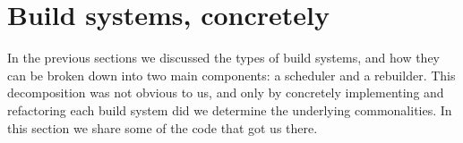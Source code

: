 \section{Build systems, concretely}\label{sec-implementations}

In the previous sections we discussed the types of build systems, and how they
can be broken down into two main components: a scheduler and a rebuilder. This
decomposition was not obvious to us, and only by concretely implementing and
refactoring each build system did we determine the underlying commonalities.
In this section we share some of the code that got us there.

\subsection{\Make}\label{sec-implementation-make}

